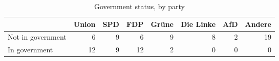\begin{table*}[t!]
\centering
\caption{Government status, by party} 
\begingroup\small
\begin{tabular}{lrrrrrrr}
  \toprule
 & Union & SPD & FDP & Grüne & Die Linke & AfD & Andere \\ 
  \midrule
Not in government & 6 & 9 & 6 & 9 & 8 & 2 & 19 \\ 
  In government & 12 & 9 & 12 & 2 & 0 & 0 & 0 \\ 
   \bottomrule
\end{tabular}
\endgroup
\end{table*}
